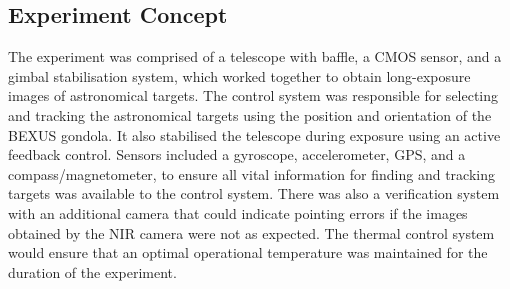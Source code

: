 \subsection{Experiment Concept}

The experiment was comprised of a telescope with baffle, a CMOS sensor, and a gimbal stabilisation system, which worked together to obtain long-exposure images of astronomical targets. The control system was responsible for selecting and tracking the astronomical targets using the position and orientation of the BEXUS gondola. It also stabilised the telescope during exposure using an active feedback control. Sensors included a gyroscope, accelerometer, GPS, and a compass/magnetometer, to ensure all vital information for finding and tracking targets was available to the control system. There was also a verification system with an additional camera that could indicate pointing errors if the images obtained by the NIR camera were not as expected. The thermal control system would ensure that an optimal operational temperature was maintained for the duration of the experiment.
